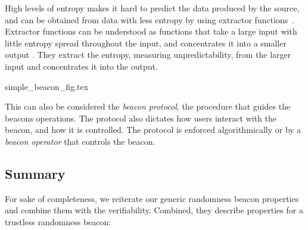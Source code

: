 High levels of entropy makes it hard to predict the data produced by the source, and can be obtained from data with less entropy by using extractor functions~\cite{pseudorandomness}.
Extractor functions can be understood as functions that take a large input with little entropy spread throughout the input, and concentrates it into a smaller output .
They extract the entropy, measuring unpredictability, from the larger input and concentrates it into the output. 


{simple_beacon_fig.tex}

This can also be considered the \emph{beacon protocol}, the procedure that guides the beacons operations.
The protocol also dictates how users interact with the beacon, and how it is controlled.
The protocol is enforced algorithmically or by a \emph{beacon operator} that controls the beacon.

\subsection{Summary}

For sake of completeness, we reiterate our generic randomness beacon properties and combine them with the verifiability.
Combined, they describe properties for a trustless randomness beacon:


